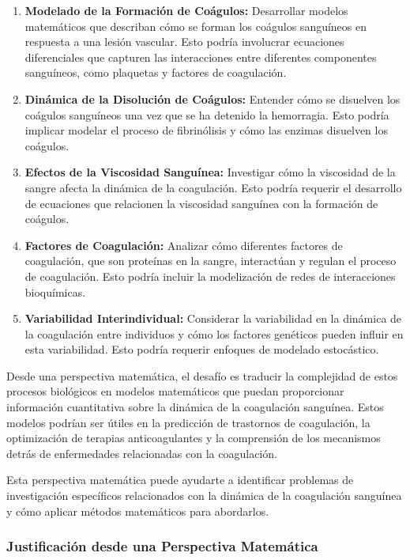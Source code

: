 \documentclass{article}
\begin{document}
\begin{enumerate}
    \item \textbf{Modelado de la Formación de Coágulos:} Desarrollar modelos matemáticos que describan cómo se forman los coágulos sanguíneos en respuesta a una lesión vascular. Esto podría involucrar ecuaciones diferenciales que capturen las interacciones entre diferentes componentes sanguíneos, como plaquetas y factores de coagulación.

    \item \textbf{Dinámica de la Disolución de Coágulos:} Entender cómo se disuelven los coágulos sanguíneos una vez que se ha detenido la hemorragia. Esto podría implicar modelar el proceso de fibrinólisis y cómo las enzimas disuelven los coágulos.

    \item \textbf{Efectos de la Viscosidad Sanguínea:} Investigar cómo la viscosidad de la sangre afecta la dinámica de la coagulación. Esto podría requerir el desarrollo de ecuaciones que relacionen la viscosidad sanguínea con la formación de coágulos.

    \item \textbf{Factores de Coagulación:} Analizar cómo diferentes factores de coagulación, que son proteínas en la sangre, interactúan y regulan el proceso de coagulación. Esto podría incluir la modelización de redes de interacciones bioquímicas.

    \item \textbf{Variabilidad Interindividual:} Considerar la variabilidad en la dinámica de la coagulación entre individuos y cómo los factores genéticos pueden influir en esta variabilidad. Esto podría requerir enfoques de modelado estocástico.
\end{enumerate}

Desde una perspectiva matemática, el desafío es traducir la complejidad de estos procesos biológicos en modelos matemáticos que puedan proporcionar información cuantitativa sobre la dinámica de la coagulación sanguínea. Estos modelos podrían ser útiles en la predicción de trastornos de coagulación, la optimización de terapias anticoagulantes y la comprensión de los mecanismos detrás de enfermedades relacionadas con la coagulación.

Esta perspectiva matemática puede ayudarte a identificar problemas de investigación específicos relacionados con la dinámica de la coagulación sanguínea y cómo aplicar métodos matemáticos para abordarlos.
\subsubsection{Justificación desde una Perspectiva Matemática}
\end{document}
